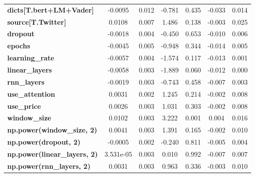 \begin{center}
\begin{tabular}{lcccccc}
\textbf{dicts[T.bert+LM+Vader]}      &      -0.0095  &        0.012     &    -0.781  &         0.435        &       -0.033    &        0.014     \\
\textbf{source[T.Twitter]}           &       0.0108  &        0.007     &     1.486  &         0.138        &       -0.003    &        0.025     \\
\textbf{dropout}                     &      -0.0018  &        0.004     &    -0.450  &         0.653        &       -0.010    &        0.006     \\
\textbf{epochs}                      &      -0.0045  &        0.005     &    -0.948  &         0.344        &       -0.014    &        0.005     \\
\textbf{learning\_rate}              &      -0.0057  &        0.004     &    -1.574  &         0.117        &       -0.013    &        0.001     \\
\textbf{linear\_layers}              &      -0.0058  &        0.003     &    -1.889  &         0.060        &       -0.012    &        0.000     \\
\textbf{rnn\_layers}                 &      -0.0019  &        0.003     &    -0.743  &         0.458        &       -0.007    &        0.003     \\
\textbf{use\_attention}              &       0.0031  &        0.002     &     1.245  &         0.214        &       -0.002    &        0.008     \\
\textbf{use\_price}                  &       0.0026  &        0.003     &     1.031  &         0.303        &       -0.002    &        0.008     \\
\textbf{window\_size}                &       0.0102  &        0.003     &     3.222  &         0.001        &        0.004    &        0.016     \\
\textbf{np.power(window\_size, 2)}   &       0.0041  &        0.003     &     1.391  &         0.165        &       -0.002    &        0.010     \\
\textbf{np.power(dropout, 2)}        &      -0.0005  &        0.002     &    -0.240  &         0.811        &       -0.005    &        0.004     \\
\textbf{np.power(linear\_layers, 2)} &    3.531e-05  &        0.003     &     0.010  &         0.992        &       -0.007    &        0.007     \\
\textbf{np.power(rnn\_layers, 2)}    &       0.0031  &        0.003     &     0.963  &         0.336        &       -0.003    &        0.010     \\

\end{tabular}
\end{center}
